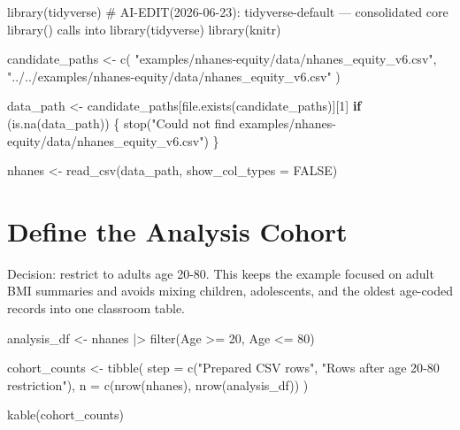 \documentclass[
  letterpaper,
  DIV=11,
  numbers=noendperiod,
  oneside]{scrreprt}
\newenvironment{Shaded}{\begin{snugshade}}{\end{snugshade}}
\newcommand{\AttributeTok}[1]{\textcolor[rgb]{0.40,0.45,0.13}{#1}}
\newcommand{\CommentTok}[1]{\textcolor[rgb]{0.37,0.37,0.37}{#1}}
\newcommand{\ConstantTok}[1]{\textcolor[rgb]{0.56,0.35,0.01}{#1}}
\newcommand{\ControlFlowTok}[1]{\textcolor[rgb]{0.00,0.23,0.31}{\textbf{#1}}}
\newcommand{\DecValTok}[1]{\textcolor[rgb]{0.68,0.00,0.00}{#1}}
\newcommand{\FunctionTok}[1]{\textcolor[rgb]{0.28,0.35,0.67}{#1}}
\newcommand{\NormalTok}[1]{\textcolor[rgb]{0.00,0.23,0.31}{#1}}
\newcommand{\OtherTok}[1]{\textcolor[rgb]{0.00,0.23,0.31}{#1}}
\newcommand{\SpecialCharTok}[1]{\textcolor[rgb]{0.37,0.37,0.37}{#1}}
\newcommand{\StringTok}[1]{\textcolor[rgb]{0.13,0.47,0.30}{#1}}
\begin{document}
\begin{Shaded}
\begin{Highlighting}[numbers=left,,]
\FunctionTok{library}\NormalTok{(tidyverse)  }\CommentTok{\# AI{-}EDIT(2026{-}06{-}23): tidyverse{-}default — consolidated core library() calls into library(tidyverse)}
\FunctionTok{library}\NormalTok{(knitr)}

\NormalTok{candidate\_paths }\OtherTok{\textless{}{-}} \FunctionTok{c}\NormalTok{(}
  \StringTok{"examples/nhanes{-}equity/data/nhanes\_equity\_v6.csv"}\NormalTok{,}
  \StringTok{"../../examples/nhanes{-}equity/data/nhanes\_equity\_v6.csv"}
\NormalTok{)}

\NormalTok{data\_path }\OtherTok{\textless{}{-}}\NormalTok{ candidate\_paths[}\FunctionTok{file.exists}\NormalTok{(candidate\_paths)][}\DecValTok{1}\NormalTok{]}
\ControlFlowTok{if}\NormalTok{ (}\FunctionTok{is.na}\NormalTok{(data\_path)) \{}
  \FunctionTok{stop}\NormalTok{(}\StringTok{"Could not find examples/nhanes{-}equity/data/nhanes\_equity\_v6.csv"}\NormalTok{)}
\NormalTok{\}}

\NormalTok{nhanes }\OtherTok{\textless{}{-}} \FunctionTok{read\_csv}\NormalTok{(data\_path, }\AttributeTok{show\_col\_types =} \ConstantTok{FALSE}\NormalTok{)}
\end{Highlighting}
\end{Shaded}

\section*{Define the Analysis Cohort}\label{define-the-analysis-cohort}


Decision: restrict to adults age 20-80. This keeps the example focused
on adult BMI summaries and avoids mixing children, adolescents, and the
oldest age-coded records into one classroom table.

\begin{Shaded}
\begin{Highlighting}[numbers=left,,]
\NormalTok{analysis\_df }\OtherTok{\textless{}{-}}\NormalTok{ nhanes }\SpecialCharTok{|\textgreater{}}
  \FunctionTok{filter}\NormalTok{(Age }\SpecialCharTok{\textgreater{}=} \DecValTok{20}\NormalTok{, Age }\SpecialCharTok{\textless{}=} \DecValTok{80}\NormalTok{)}

\NormalTok{cohort\_counts }\OtherTok{\textless{}{-}} \FunctionTok{tibble}\NormalTok{(}
  \AttributeTok{step =} \FunctionTok{c}\NormalTok{(}\StringTok{"Prepared CSV rows"}\NormalTok{, }\StringTok{"Rows after age 20{-}80 restriction"}\NormalTok{),}
  \AttributeTok{n =} \FunctionTok{c}\NormalTok{(}\FunctionTok{nrow}\NormalTok{(nhanes), }\FunctionTok{nrow}\NormalTok{(analysis\_df))}
\NormalTok{)}

\FunctionTok{kable}\NormalTok{(cohort\_counts)}
\end{Highlighting}
\end{Shaded}
\end{document}

